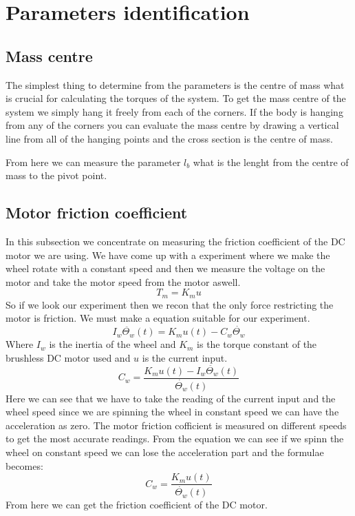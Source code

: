 \section{Parameters identification}


\subsection{Mass centre}
The simplest thing to determine from the parameters is the centre of mass what is crucial for calculating the torques of the system.
To get the mass centre of the system we simply hang it freely from each of the corners.
If the body is hanging from any of the corners you can evaluate the mass centre by drawing a vertical line from all of the hanging points and the cross section is the centre of mass.

From here we can measure the parameter $l_{b}$ what is the lenght from the centre of mass to the pivot point.

\subsection{Motor friction coefficient}
In this subsection we concentrate on measuring the friction coefficient of the DC motor we are using.
We have come up with a experiment where we make the wheel rotate with a constant speed and then we measure the voltage on the motor and take the motor speed from the motor aswell.
\begin{equation}
	\label{eq:friction coefficient}
	T_{m}=K_{m}u
\end{equation}
So if we look our experiment then we recon that the only force restricting the motor is friction. 
We must make a equation suitable for our experiment.
\begin{equation}
	\label{eq:friction in motor}
	I_{w}\ddot{\Theta_{w}}(t)=K_{m}u(t)-C_{w}\dot{\Theta_{w}}
\end{equation}
Where $I_{w}$ is the inertia of the wheel and $K_{m}$ is the torque constant of the brushless DC motor used and $u$ is the current input.
\begin{equation}
	\label{eq:friction in motor according to friction coefficient}
	C_{w}=\frac{K_{m}u(t)-I_{w}\ddot{\Theta_{w}}(t)}{\dot{\Theta_{w}}(t)}
\end{equation}
Here we can see that we have to take the reading of the current input and the wheel speed since we are spinning the wheel in constant speed we can have the acceleration as zero.
The motor friction cofficient is measured on different speeds to get the most accurate readings.
From the equation we can see if we spinn the wheel on constant speed we can lose the acceleration part and the formulae becomes:
\begin{equation}
	\label{eq:friction in motor according to friction coefficient}
	C_{w}=\frac{K_{m}u(t)}{\dot{\Theta_{w}}(t)}
\end{equation}
From here we can get the friction coefficient of the DC motor.



